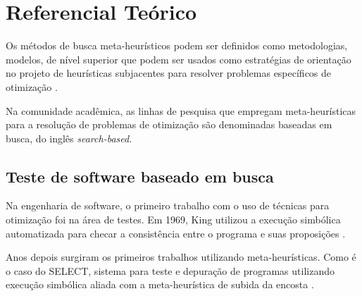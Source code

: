 
\chapter[Referencial Teórico]{Referencial Teórico}


Os métodos de busca meta-heurísticos podem ser definidos como metodologias,
modelos, de nível superior que podem ser usados como estratégias de orientação
no projeto de heurísticas subjacentes para resolver problemas específicos de
otimização \cite{talbi2009metaheuristics}.

Na comunidade acadêmica, as linhas de pesquisa que empregam meta-heurísticas
para a resolução de problemas de otimização são denominadas baseadas em busca,
do inglês \textit{search-based}.

\section{Teste de software baseado em busca}

Na engenharia de software, o primeiro trabalho com o uso de técnicas para
otimização foi na área de testes. Em 1969, King utilizou a execução simbólica
automatizada para checar a consistência entre o programa e suas proposições
\cite{king1969program}. 

Anos depois surgiram os primeiros trabalhos utilizando meta-heurísticas. Como é
o caso do SELECT, sistema para teste e depuração de programas utilizando
execução simbólica aliada com a meta-heurística de subida da encosta
\cite{boyer1975select}.


